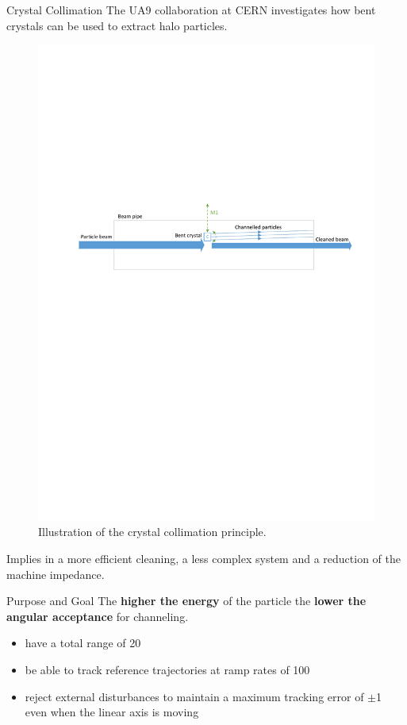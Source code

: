 \documentclass[10pt]{beamer}
\begin{document}
\begin{frame}[fragile]{Crystal Collimation}
  The UA9 collaboration at CERN investigates how bent crystals can be used to extract halo particles.

  \begin{figure}[h!]
    \centering %
    \includegraphics[width=1\textwidth, trim= 2cm 15.5cm 1cm 10cm, clip=true]{../fig/matlab/collimation}
    \caption{\label{fig:collimation}Illustration of the crystal collimation principle.}
  \end{figure}

  Implies in a more efficient cleaning, a less complex system and a reduction of the machine impedance.
\end{frame}

\begin{frame}[fragile]{Purpose and Goal}
  The \textbf{ higher the energy} of the particle the \textbf{lower the angular acceptance} for channeling.
  \begin{itemize}
    \item have a total range of \unit{20}{\milli\rad}
    \item be able to track reference trajectories at ramp rates of \unit{100}{\micro\radianpersecond}
    \item reject external disturbances to maintain a maximum tracking error of $\pm$\unit{1}{\micro\rad} even when the linear axis is moving
  \end{itemize}
\end{frame}
\end{document}
